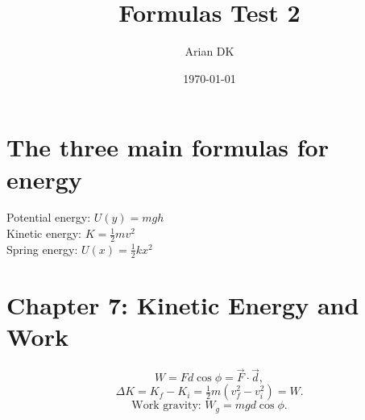 \documentclass[12pt]{article}
\title{Formulas Test 2}
\author{Arian DK}
\date{\today}
\begin{document}
\maketitle

\section*{The three main formulas for energy}

\noindent Potential energy: \( U(y) = mgh \) \\
Kinetic energy: \( K = \frac{1}{2}mv^2 \) \\
Spring energy: \( U(x) = \frac{1}{2}kx^2 \) \\

\section*{Chapter 7: Kinetic Energy and Work}
\[
W = Fd\cos\phi = \vec{F} \cdot \vec{d},
\]
\[
\Delta K = K_f - K_i = \tfrac{1}{2} m (v_f^2 - v_i^2) = W.
\]
\[
\text{Work gravity: } W_g = mgd \cos \phi.
\]
\end{document}
